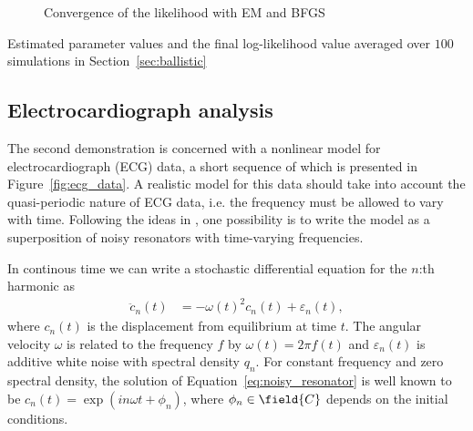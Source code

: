 \begin{figure}[htbp]
{\begin{subfigure}[b]{0.5\textwidth+0.4in}
    \end{subfigure}}%
    \caption{Convergence of the likelihood with EM and BFGS}\label{fig:ballistic_est}
 \end{figure}
 
\begin{table}[htbp]
	\caption{Estimated parameter values and the final
	log-likelihood value 
	averaged over $100$ simulations in Section~\ref{sec:ballistic}}
	\label{table:ballistic_restults}
	\centering
	\footnotesize
	
\end{table} 


\clearpage



\subsection{Electrocardiograph analysis}

The second demonstration is concerned with a nonlinear model for
electrocardiograph (ECG) data, a short sequence of which is presented
in Figure~\ref{fig:ecg_data}. A realistic model for this data 
should take into account the quasi-periodic nature of ECG data,
i.e. the frequency must be allowed to vary with time.
Following the ideas in \textcite{Sarkka2012}, one possibility
is to write the model as a superposition of noisy resonators
with time-varying frequencies.

In continous time we can write a stochastic differential equation
for the $n$:th harmonic as
\begin{align}
	 \ddot{c}_n(t)&= -\omega(t)^2c_n(t)+\varepsilon_n(t),
	\label{eq:noisy_resonator}
\end{align}
where $c_n(t)$ is the displacement from equilibrium at time $t$.
The angular velocity $\omega$ is related to the frequency $f$
by $\omega(t)=2\pi f(t)$ and  $\varepsilon_n(t)$ is additive
white noise with spectral density $q_n$. For constant frequency and
zero spectral density, the solution of Equation~\eqref{eq:noisy_resonator}
is well known to be $c_n(t)=\exp(i n \omega t+\phi_n)$, where $\phi_n\in\field{C}$ depends on 
the initial conditions.

